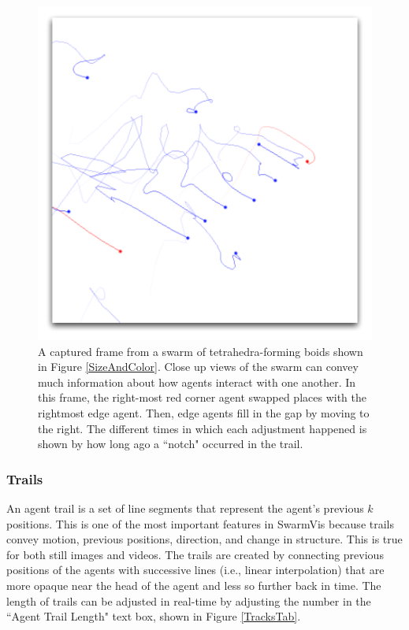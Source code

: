 \documentclass[conference]{IEEEtran}
\begin{document}
\begin{figure}
\centering
\includegraphics[scale=.5]{images/closeuptrails.pdf}
\caption{
A captured frame from a swarm of tetrahedra-forming boids shown in Figure \ref{SizeAndColor}.
Close up views of the swarm can convey much information about how agents interact with one another.
In this frame,  the right-most red corner agent swapped places with the rightmost edge agent.
Then, edge agents fill in the gap by moving to the right. The different times in which each adjustment happened
is shown by how long ago a ``notch" occurred in the trail.}
\label{CloseTrails}
\end{figure}

\subsubsection{Trails}

An agent trail is a set of line segments that represent the agent's previous $k$ positions.
This is one of the most important features in SwarmVis because trails convey motion, previous positions, direction,
and change in structure.
This is true for both still images and videos.
The trails are created by connecting previous positions of the agents with
successive lines (i.e., linear interpolation) that are more opaque near the head of the agent and less so further back in time.
The length of trails can be adjusted in real-time by adjusting the number in the ``Agent Trail Length" text box, shown in
Figure \ref{TracksTab}.
\end{document}

